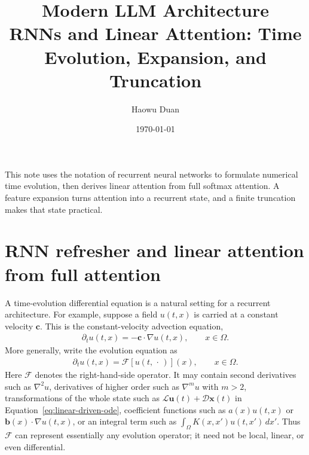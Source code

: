 \documentclass[11pt]{article}
\title{Modern LLM Architecture\\
\large RNNs and Linear Attention: Time Evolution, Expansion, and Truncation}
\author{Haowu Duan}
\date{\today}
\begin{document}
\maketitle

This note uses the notation of recurrent neural networks to formulate numerical
time evolution, then derives linear attention from full softmax attention.  A
feature expansion turns attention into a recurrent state, and a finite
truncation makes that state practical.

\section{RNN refresher and linear attention from full attention}

A time-evolution differential equation is a natural setting for a recurrent
architecture.  For example, suppose a field $u(t,x)$ is carried at a constant
velocity $\bm c$.  This is the constant-velocity advection equation,
\begin{equation}
  \begin{split}
  \partial_t u(t,x)
  =-\bm{c}\mathbin{\cdot}\nabla u(t,x),
  \qquad x\in\Omega.
  \label{eq:advection-example}
  \end{split}
\end{equation}
More generally, write the evolution equation as
\begin{equation}
  \begin{split}
  \partial_t u(t,x)
  =\mathcal F[u(t,\,\cdot\,)](x),
  \qquad x\in\Omega.
  \label{eq:generic-time-evolution}
  \end{split}
\end{equation}
Here $\mathcal F$ denotes the right-hand-side operator.  It may contain
second derivatives such as $\nabla^2u$, derivatives of higher order such as
$\nabla^m u$ with $m>2$, transformations of the whole state such as
$\mathcal L\bm{u}(t)+\mathcal D\bm{x}(t)$ in
Equation~\eqref{eq:linear-driven-ode}, coefficient functions such as
$a(x)u(t,x)$ or
$\bm{b}(x)\mathbin{\cdot}\nabla u(t,x)$, or an integral term such as
$\int_\Omega K(x,x')u(t,x')\,dx'$.  Thus $\mathcal F$ can represent
essentially any evolution operator; it need not be local, linear, or even
differential.
\end{document}
